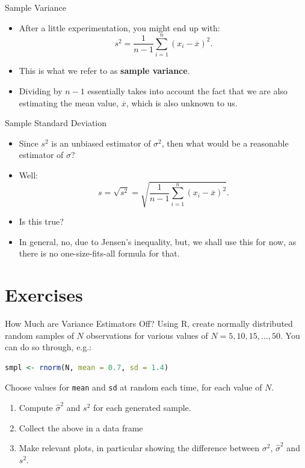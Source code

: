 \documentclass[aspectratio=169, 12pt, xcolor=table]{beamer}
\begin{document}
	\begin{frame}{Sample Variance}
		\begin{itemize}
			\item After a little experimentation, you might end up with:
			\[s^2=\frac{1}{n-1}\sum_{i=1}^n(x_i-\overline{x})^2.\]
			\item This is what we refer to as \textbf{sample variance}.
			\item Dividing by $n-1$ essentially takes into account the fact that we are also estimating the mean value, $\overline{x}$, which is also unknown to us.
		\end{itemize}
	\end{frame}

	\begin{headsup}{Sample Standard Deviation}
		\begin{itemize}
			\item Since $s^2$ is an unbiased estimator of $\sigma^2$, then what would be a reasonable estimator of $\sigma$?\pause
			\item Well:
			\[s=\sqrt{s^2}=\sqrt{\frac{1}{n-1}\sum_{i=1}^n(x_i-\overline{x})^2}.\]\pause
			\item Is this true?\pause
			\item In general, no, due to Jensen's inequality, but, we shall use this for now, as there is no one-size-fits-all formula for that.
		\end{itemize}
	\end{headsup}


	\section{Exercises}
	
	\sectionframe
	
	
	\begin{frame}[fragile]{How Much are Variance Estimators Off?}
		Using R, create normally distributed random samples of $N$ observations for various values of $N=5,10,15,\ldots,50$. You can do so through, e.g.:
		\begin{lstlisting}[language=R]
smpl <- rnorm(N, mean = 0.7, sd = 1.4)
\end{lstlisting}
		Choose values for \texttt{mean} and \texttt{sd} at random each time, for each value of $N$.
		\begin{enumerate}
			\item Compute $\hat{\sigma}^2$ and $s^2$ for each generated sample.
			\item Collect the above in a data frame
			\item Make relevant plots, in particular showing the difference between $\sigma^2$, $\hat{\sigma}^2$ and $s^2$.
		\end{enumerate}
	\end{frame}
\end{document}
